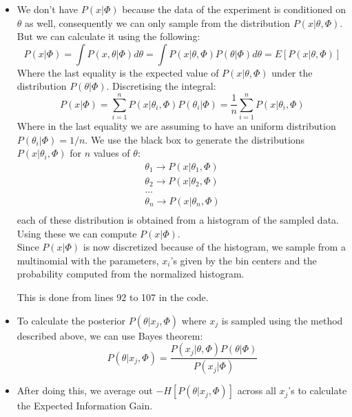 \documentclass{article}
\begin{document}
\begin{itemize}
\item We don't have $P(x|\Phi)$ because the data of the experiment is conditioned on $\theta$ as well, consequently we can only sample from the distribution $P(x |\theta,\Phi)$. But we can calculate it using the following:
\begin{equation}
P(x|\Phi) = \int P(x,\theta | \Phi)d \theta = 
\int P(x| \theta , \Phi) P(\theta | \Phi)d \theta = E[P(x| \theta , \Phi)]
\end{equation}
Where the last equality is the expected value of $P(x| \theta , \Phi)$ under the distribution $P(\theta | \Phi)$.
Discretising the integral:
\begin{equation}
P(x|\Phi) = \sum_{i=1}^{n}  P(x |\theta_i,\Phi)P(\theta_i | \Phi) = \frac{1}{n} \sum_{i=1}^{n}  P(x |\theta_i,\Phi) 
\end{equation}
Where in the last equality we are assuming to have an uniform distribution $P(\theta_i | \Phi) =1/n$.
We use the black box to generate the distributions $P(x |\theta_i,\Phi) $ for $n$ values of $\theta$:
\begin{equation}
\begin{array}{ll}
\theta_1 \rightarrow P(x |\theta_1,\Phi)\\
\theta_2 \rightarrow P(x |\theta_2,\Phi)\\
\dots\\
\theta_n \rightarrow P(x |\theta_n,\Phi)\\
\end{array}
\end{equation}
each of these distribution is obtained from a histogram of the sampled data.
Using these we can compute $P(x|\Phi)$. \\

Since $P(x | \Phi)$ is now discretized because of the histogram, we sample from a multinomial with the parameters, $x_i$'s given by the bin centers and the probability computed from the normalized histogram.

This is done from lines 92 to 107 in the code.

\item To calculate the posterior $P(\theta|x_j,\Phi)$ where $x_j$ is sampled using the method described above, we can use Bayes theorem:
\begin{equation}
P(\theta|x_j,\Phi)=\frac{P(x_j|\theta,\Phi)P(\theta|\Phi)}{P(x_j|\Phi)}
\end{equation}

\item After doing this, we average out $-H[P(\theta|x_j ,\Phi)]$ across all $x_j$'s to calculate the Expected Information Gain.
\end{itemize}
\end{document}
